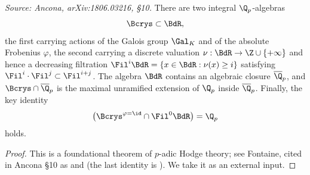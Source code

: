 \begin{theorem}
  \label{thm:bcrys-bdr}
  \textit{Source: Ancona, arXiv:1806.03216, \S10.}
  There are two integral \(\Q_p\)-algebras
  \[\Bcrys \subset \BdR,\]
  the first carrying actions of the Galois group \(\Gal_K\) and of the absolute
  Frobenius \(\varphi\), the second carrying a discrete valuation
  \(\nu : \BdR \to \Z \cup \{+\infty\}\) and hence a decreasing filtration
  \(\Fil^i \BdR = \{x \in \BdR : \nu(x) \geq i\}\) satisfying
  \(\Fil^i \cdot \Fil^j \subset \Fil^{i+j}\). The algebra \(\BdR\) contains an
  algebraic closure \(\overline{\Q}_p\), and \(\Bcrys \cap \overline{\Q}_p\) is
  the maximal unramified extension of \(\Q_p\) inside \(\overline{\Q}_p\).
  Finally, the key identity
  \[\bigl(\Bcrys^{\varphi=\id} \cap \Fil^0 \BdR\bigr) = \Q_p\]
  holds.
\end{theorem}

\begin{proof}
  This is a foundational theorem of \(p\)-adic Hodge theory; see Fontaine, cited
  in Ancona \S10 as \cite{Fonfon} and \cite{Fontp} (the last identity is
  \cite[Theorem~5.3.7]{Fontp}). We take it as an external input.
\end{proof}

